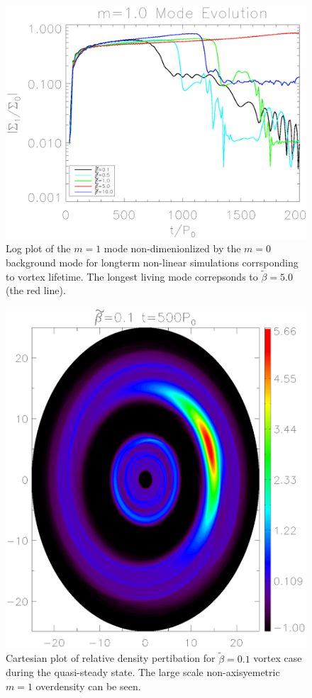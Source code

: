 \begin{figure}
  \includegraphics[width=\linewidth,clip=true,trim=0.5cm
    0cm 0cm 1cm]{figures/longterm_stability}
  \caption{Log plot of the $m=1$ mode non-dimenionlized by the $m=0$ background mode for longterm non-linear simulations corrsponding to vortex lifetime. The longest living mode correpsonds to $\tilde\beta=5.0$ (the red line). \label{lifetimeplot}}
\end{figure}

\begin{figure}
  \includegraphics[width=\linewidth,height=\linewidth]{figures/vortex2D}
  \caption{Cartesian plot of relative density pertibation for $\tilde\beta=0.1$ vortex case during the quasi-steady state. The large scale non-axisyemetric $m=1$ overdensity can be seen. \label{Vortex2D}}
\end{figure}

